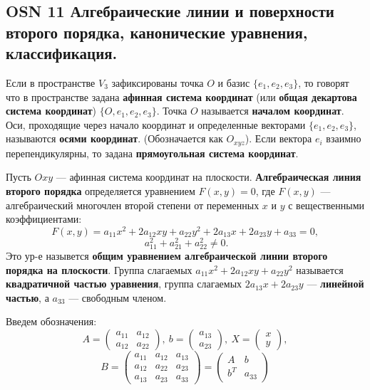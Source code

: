 \subsection*{OSN 11 Алгебраические линии и поверхности второго порядка, канонические уравнения,  классификация.}

Если в пространстве $V_3$ зафиксированы точка $O$ и базис $\{e_1, e_2, e_3\}$, то говорят что в пространстве задана \textbf{афинная система координат} (или \textbf{общая декартова система координат}) $\{O, e_1, e_2, e_3\}$. Точка $O$ называется \textbf{началом координат}. Оси, проходящие через начало координат и определенные векторами $\{e_1, e_2, e_3\}$, называются \textbf{осями координат}. (Обозначается как $O_{xyz}$). Если вектора $e_i$ взаимно перепендикулярны, то задана \textbf{прямоугольная система координат}.

\bigbreak

Пусть $Oxy$ --- афинная система координат на плоскости. \textbf{Алгебраическая линия второго порядка} определяется уравнением $F(x, y) = 0$, где $F(x, y)$ --- алгебраический многочлен второй степени от переменных $x$ и $y$ с вещественными коэффициентами:
$$F(x,y)=a_{11}x^2 +2a_{12}xy+a_{22}y^2 +2a_{13}x+2a_{23}y+a_{33} =0,$$
$$~a_{11}^2 + a_{21}^2 + a_{22}^2\neq 0.$$
Это ур-е назывется \textbf{общим уравнением алгебраической линии второго порядка на плоскости}. Группа слагаемых $a_{11}x^2 + 2a_{12}xy + a_{22}y^2$ называется \textbf{квадратичной частью уравнения}, группа слагаемых $2a_{13}x + 2a_{23}y$ --- \textbf{линейной частью}, а $a_{33}$ --- свободным членом.

Введем обозначения:
$$A = \begin{pmatrix} a_{11} & a_{12} \\a_{12} & a_{22}\end{pmatrix},~ b=\begin{pmatrix} a_{13} \\ a_{23} \end{pmatrix},~ X=\begin{pmatrix}x \\ y\end{pmatrix},$$
$$B = \begin{pmatrix} a_{11} & a_{12} & a_{13} \\a_{12} & a_{22} & a_{23} \\ a_{13} & a_{23} & a_{33}\end{pmatrix} = \begin{pmatrix} A & b \\ b^T & a_{33}\end{pmatrix}$$

